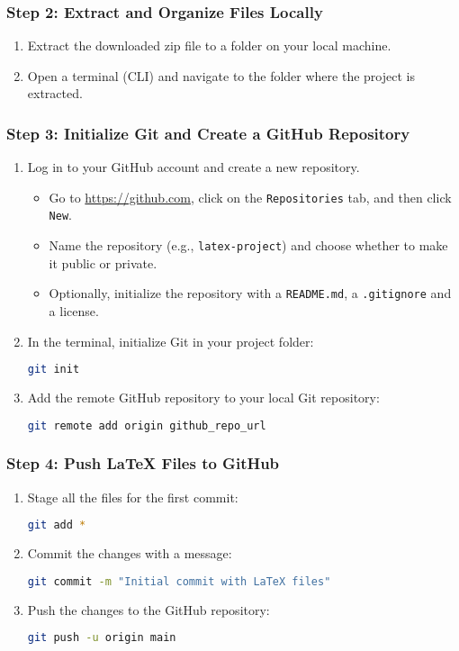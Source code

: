 \subsubsection{Step 2: Extract and Organize Files Locally}
\begin{enumerate}
    \item Extract the downloaded zip file to a folder on your local machine.
    \item Open a terminal (CLI) and navigate to the folder where the project is extracted.
\end{enumerate}

\subsubsection{Step 3: Initialize Git and Create a GitHub Repository}
\begin{enumerate}
    \item Log in to your GitHub account and create a new repository.
    \begin{itemize}
        \item Go to \url{https://github.com}, click on the \texttt{Repositories} tab, and then click \texttt{New}.
        \item Name the repository (e.g., \texttt{latex-project}) and choose whether to make it public or private.
        \item Optionally, initialize the repository with a \texttt{README.md}, a \texttt{.gitignore} and a license.
    \end{itemize}
    \item In the terminal, initialize Git in your project folder:
    \begin{lstlisting}[language=bash]
    git init
    \end{lstlisting}
    \item Add the remote GitHub repository to your local Git repository:
    \begin{lstlisting}[language=bash]
    git remote add origin github_repo_url
    \end{lstlisting}
\end{enumerate}

\subsubsection{Step 4: Push LaTeX Files to GitHub}
\begin{enumerate}
    \item Stage all the files for the first commit:
    \begin{lstlisting}[language=bash]
    git add *
    \end{lstlisting}
    \item Commit the changes with a message:
    \begin{lstlisting}[language=bash]
    git commit -m "Initial commit with LaTeX files"
    \end{lstlisting}
    \item Push the changes to the GitHub repository:
    \begin{lstlisting}[language=bash]
    git push -u origin main
    \end{lstlisting}
\end{enumerate}

